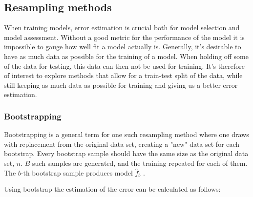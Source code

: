 




\subsection{Resampling methods}

When training models, error estimation is crucial both for model selection and model assessment. Without a good metric for the performance of the model it is impossible to gauge how well fit a model actually is.
Generally, it's desirable to have as much data as possible for the training of a model. When holding off some of the data for testing, this data can then not be used for training. It's therefore of interest to explore methods that allow for a train-test split of the data, while still keeping as much data as possible for training and giving us a better error estimation.

\subsubsection{Bootstrapping}
Bootstrapping is a general term for one such resampling method where one draws with replacement from the original data set, creating a "new" data set for each bootstrap. Every bootstrap sample should have the same size as the original data set, $n$. $B$ such samples are generated, and the training repeated for each of them.
The $b$-th bootstrap sample produces model $\hat{f}_b$ \citep[p. 249]{hastie}.

Using bootstrap the estimation of the error can be calculated as follows:

